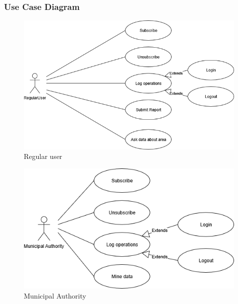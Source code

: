 	\subsubsection{Use Case Diagram}
	\begin{figure}[h!]
		\includegraphics[scale=0.65]{Images/UseCaseDiagram-RegularUser}
		\caption{Regular user}
	\end{figure}
	\begin{figure}[h!]
		\includegraphics[scale=0.65]{Images/UseCaseDiagram-MunicipalAuthority}
		\caption{Municipal Authority}
	\end{figure}
\newpage
